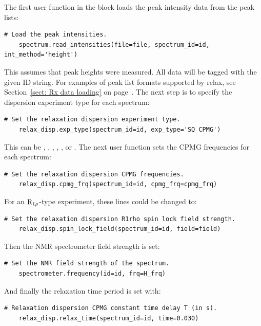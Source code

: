 The first user function in the block loads the peak intensity data from the peak lists:

\begin{lstlisting}[firstnumber=96]
    # Load the peak intensities.
    spectrum.read_intensities(file=file, spectrum_id=id, int_method='height')
\end{lstlisting}

This assumes that peak heights were measured.  All data will be tagged with the given ID string.  For examples of peak list formats supported by relax, see Section~\ref{sect: Rx data loading} on page~\pageref{sect: Rx data loading}.
The next step is to specify the dispersion experiment type for each spectrum:

\begin{lstlisting}[firstnumber=99]
    # Set the relaxation dispersion experiment type.
    relax_disp.exp_type(spectrum_id=id, exp_type='SQ CPMG')
\end{lstlisting}

This can be , ,  ,  ,  ,  or .
The next user function sets the CPMG frequencies for each spectrum:

\begin{lstlisting}[firstnumber=102]
    # Set the relaxation dispersion CPMG frequencies.
    relax_disp.cpmg_frq(spectrum_id=id, cpmg_frq=cpmg_frq)
\end{lstlisting}

For an $\mathrm{R}_{1\rho}$-type experiment, these lines could be changed to:

\begin{lstlisting}[numbers=none]
    # Set the relaxation dispersion R1rho spin lock field strength.
    relax_disp.spin_lock_field(spectrum_id=id, field=field)
\end{lstlisting}

Then the NMR spectrometer field strength is set:

\begin{lstlisting}[firstnumber=105]
    # Set the NMR field strength of the spectrum.
    spectrometer.frequency(id=id, frq=H_frq)
\end{lstlisting}

And finally the relaxation time period is set with:

\begin{lstlisting}[firstnumber=108]
    # Relaxation dispersion CPMG constant time delay T (in s).
    relax_disp.relax_time(spectrum_id=id, time=0.030)
\end{lstlisting}

